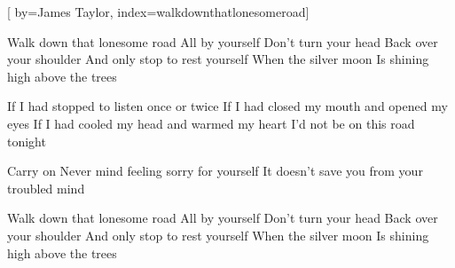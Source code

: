 
[%
    by={James Taylor},
    index={walkdownthatlonesomeroad}]


    \label{walkdownthatlonesomeroad}

    \beginchorus
        Walk down that lonesome road
        All by yourself
        Don't turn your head
        Back over your shoulder
        And only stop to rest yourself
        When the silver moon
        Is shining high above the trees
    \endchorus

    \beginverse
        If I had stopped to listen once or twice
        If I had closed my mouth and opened my eyes
        If I had cooled my head and warmed my heart
        I'd not be on this road tonight
    \endverse

    \beginverse*
        Carry on 
        Never mind feeling sorry for yourself
        It doesn't save you from your troubled mind
    \endverse

    \beginchorus
        Walk down that lonesome road
        All by yourself
        Don't turn your head
        Back over your shoulder
        And only stop to rest yourself
        When the silver moon
        Is shining high above the trees
    \endchorus
\endsong
